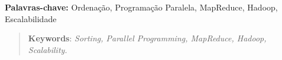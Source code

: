 \begin{resumo}
    
    \textbf{Palavras-chave:} Ordenação, Programação Paralela, MapReduce, Hadoop, Escalabilidade
\end{resumo}


\begin{abstract}
	
	
    \textbf{Keywords}: \textit{Sorting, Parallel Programming, MapReduce, Hadoop, Scalability.}
\end{abstract}
